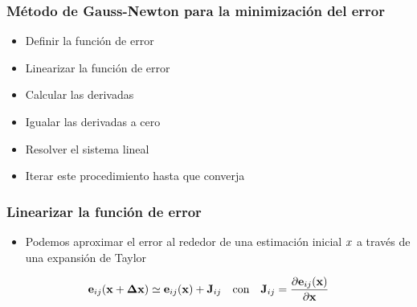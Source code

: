 \begin{frame}
	\frametitle{Método de Gauss-Newton para la minimización del error}
    
    \begin{itemize}
        \item Definir la función de error
        \item Linearizar la función de error
        \item Calcular las derivadas
        \item Igualar las derivadas a cero
        \item Resolver el sistema lineal
        \item Iterar este procedimiento hasta que converja
    \end{itemize}
    
	
\end{frame}

\begin{frame}
	\frametitle{Linearizar la función de error}
    
    \begin{itemize}
        \item Podemos aproximar el error al rededor de una estimación inicial $x$ a través de una expansión de Taylor
    \end{itemize}

    \begin{equation*}
        \boldsymbol{\mathbf{e}}_{ij}(\boldsymbol{\mathbf{x}} + \boldsymbol{\mathbf{\Delta}}\boldsymbol{\mathbf{x}}) \simeq  \boldsymbol{\mathbf{e}}_{ij}(\boldsymbol{\mathbf{x}}) + \boldsymbol{\mathbf{J}}_{ij} \quad \text{con} \quad \boldsymbol{\mathbf{J}}_{ij} = \dfrac{\partial\boldsymbol{\mathbf{e}}_{ij}(\boldsymbol{\mathbf{x}})}{\partial\boldsymbol{\mathbf{x}}}
    \end{equation*}
	
\end{frame}

